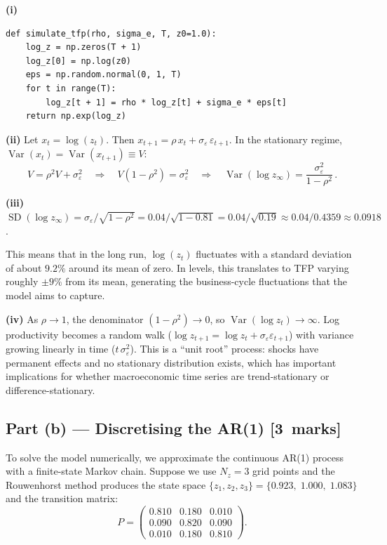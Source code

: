 \documentclass[11pt,a4paper]{article}
\newcommand{\mkpts}[1]{\hfill\textbf{[#1~marks]}}
\begin{document}
\begin{solution}
\textbf{(i)}
\begin{lstlisting}[numbers=none]
def simulate_tfp(rho, sigma_e, T, z0=1.0):
    log_z = np.zeros(T + 1)
    log_z[0] = np.log(z0)
    eps = np.random.normal(0, 1, T)
    for t in range(T):
        log_z[t + 1] = rho * log_z[t] + sigma_e * eps[t]
    return np.exp(log_z)
\end{lstlisting}

\textbf{(ii)} Let $x_t = \log(z_t)$.  Then $x_{t+1} = \rho\,x_t + \sigma_\varepsilon\,\varepsilon_{t+1}$.  In the stationary regime, $\operatorname{Var}(x_t) = \operatorname{Var}(x_{t+1}) \equiv V$:
\[
V = \rho^2 V + \sigma_\varepsilon^2 \quad\Longrightarrow\quad V(1-\rho^2) = \sigma_\varepsilon^2 \quad\Longrightarrow\quad \boxed{\operatorname{Var}(\log z_\infty) = \frac{\sigma_\varepsilon^2}{1-\rho^2}}\,.
\]

\textbf{(iii)} $\operatorname{SD}(\log z_\infty) = \sigma_\varepsilon / \sqrt{1-\rho^2} = 0.04/\sqrt{1-0.81} = 0.04/\sqrt{0.19} \approx 0.04/0.4359 \approx 0.0918$.

This means that in the long run, $\log(z_t)$ fluctuates with a standard deviation of about $9.2\%$ around its mean of zero.  In levels, this translates to TFP varying roughly $\pm 9\%$ from its mean, generating the business-cycle fluctuations that the model aims to capture.

\medskip

\textbf{(iv)} As $\rho \to 1$, the denominator $(1-\rho^2) \to 0$, so $\operatorname{Var}(\log z_t) \to \infty$.  Log productivity becomes a random walk ($\log z_{t+1} = \log z_t + \sigma_\varepsilon\varepsilon_{t+1}$) with variance growing linearly in time ($t\,\sigma_\varepsilon^2$).  This is a ``unit root'' process: shocks have permanent effects and no stationary distribution exists, which has important implications for whether macroeconomic time series are trend-stationary or difference-stationary.
\end{solution}

\subsection*{Part (b) --- Discretising the AR(1) \mkpts{3}}

To solve the model numerically, we approximate the continuous AR(1) process with a finite-state Markov chain.  Suppose we use $N_z = 3$ grid points and the Rouwenhorst method produces the state space $\{z_1, z_2, z_3\} = \{0.923,\; 1.000,\; 1.083\}$ and the transition matrix:
\[
P = \begin{pmatrix} 0.810 & 0.180 & 0.010 \\ 0.090 & 0.820 & 0.090 \\ 0.010 & 0.180 & 0.810 \end{pmatrix}.
\]
\end{document}
